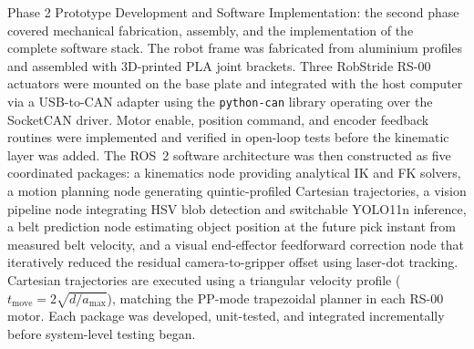 \par
\hspace{1.27cm}
Phase 2 Prototype Development and Software
Implementation: the second phase covered mechanical fabrication, assembly, and
the implementation of the complete software stack. The robot
frame was fabricated from aluminium profiles and assembled with
3D-printed PLA joint brackets. Three RobStride RS-00 actuators
were mounted on the base plate and integrated with the host
computer via a USB-to-CAN adapter using the \texttt{python-can}
library operating over the SocketCAN driver. Motor enable,
position command, and encoder feedback routines were implemented
and verified in open-loop tests before the kinematic layer was
added. The ROS~2 software architecture was then constructed as
five coordinated packages: a kinematics node providing
analytical IK and FK solvers, a motion planning node generating
quintic-profiled Cartesian trajectories, a vision pipeline node
integrating HSV blob detection and switchable YOLO11n inference,
a belt prediction node estimating object position at the future
pick instant from measured belt velocity, and a visual
end-effector feedforward correction node that iteratively
reduced the residual camera-to-gripper offset using laser-dot
tracking. Cartesian trajectories are executed using a triangular
velocity profile ($t_{\text{move}} = 2\sqrt{d/a_{\max}}$),
matching the PP-mode trapezoidal planner in each RS-00 motor.
Each package was developed, unit-tested, and
integrated incrementally before system-level testing began.

